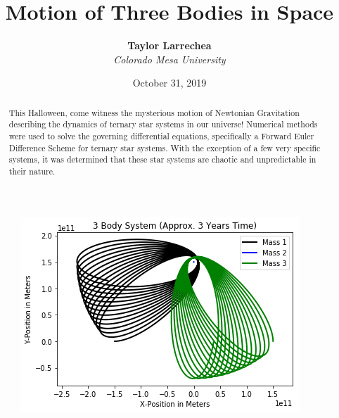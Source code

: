 \documentclass[11pt]{diazessay} %
\title{\textbf{Motion of Three Bodies in Space}} %
\author{\textbf{Taylor Larrechea} \\ \textit{Colorado Mesa University}} %
\date{October 31, 2019} %
\begin{document}
\maketitle %


\begin{abstract}
This Halloween, come witness the mysterious motion of Newtonian Gravitation describing the dynamics of ternary star systems in our universe! Numerical methods were used to solve the governing differential equations, specifically a Forward Euler Difference Scheme for ternary star systems. With the exception of a few very specific systems, it was determined that these star systems are chaotic and unpredictable in their nature.
\end{abstract}

\begin{center}
\begin{figure}[htpb]
\includegraphics[width=1.00\linewidth]{Figures/3BodyDynamics.png}
\end{figure}
\end{center}
\end{document}

